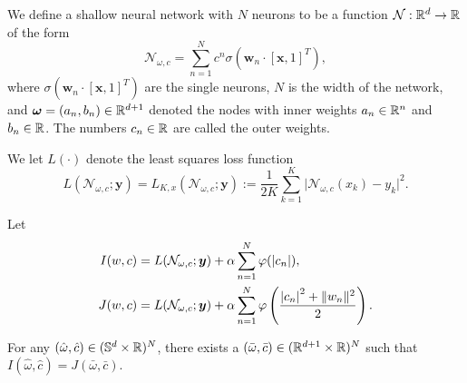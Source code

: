 \documentclass[twoside]{article}
\begin{document}
    \begin{definition}
        We define a shallow neural network with $N$ neurons to be a function $\mathcal{N} : \mathbb{R}^{d} \to \mathbb{R}$
        of the form
        \begin{equation*}
            \mathcal{N}_{\omega, c} = \sum_{n=1}^{N}c^{n} \sigma(\bm{w}_{n} \cdot [\bm{x}, 1]^{T}),
        \end{equation*}
        where $\sigma(\bm{w}_{n} \cdot [\bm{x}, 1]^{T})$ are the single neurons, $N$ is the width of the network,
        and $\bm{\omega} = (a_{n}, b_{n}) \in \mathbb{R}^{d + 1}$ denoted the nodes with inner
        weights $a_{n} \in \mathbb{R}^{n}$ and $b_{n} \in \mathbb{R}$. The numbers $c_{n} \in \mathbb{R}$ are called
        the outer weights.
    \end{definition}

    \begin{definition}
        We let $L(\cdot)$ denote the least squares loss function
        \begin{equation*}
            L(\mathcal{N}_{\omega, c} ; \bm{y}) = L_{K, x}(\mathcal{N}_{\omega, c} ; \bm{y}) 
            := \frac{1}{2K}\sum_{k = 1}^{K} \lvert \mathcal{N}_{\omega, c}(x_{k}) - y_{k} \rvert^{2}.
        \end{equation*}
    \end{definition}

    \begin{lemma}
        Let 
        \begin{align*}
            I(w, c) &= L(\mathcal{N}_{\omega, c} ; \bm{y}) + \alpha \sum_{n = 1}^{N} \varphi(\rvert c_{n} \lvert),\\ 
            J(w, c) &=  L(\mathcal{N}_{\omega, c} ; \bm{y}) 
            + \alpha \sum_{n=1}^{N} \varphi\left(\frac{\abs{c_{n}}^{2} + \lVert w_{n} \rVert^{2}}{2}\right).
        \end{align*}

        For any $(\hat{\omega}, \hat{c}) \in (\mathbb{S}^{d} \times \mathbb{R})^{N}$, there exists a 
        $(\bar{\omega}, \bar{c}) \in (\mathbb{R}^{d + 1} \times \mathbb{R})^{N}$
        such that $I(\hat{\omega}, \hat{c}) = J(\bar{\omega}, \bar{c})$.
    \end{lemma}
\end{document}
